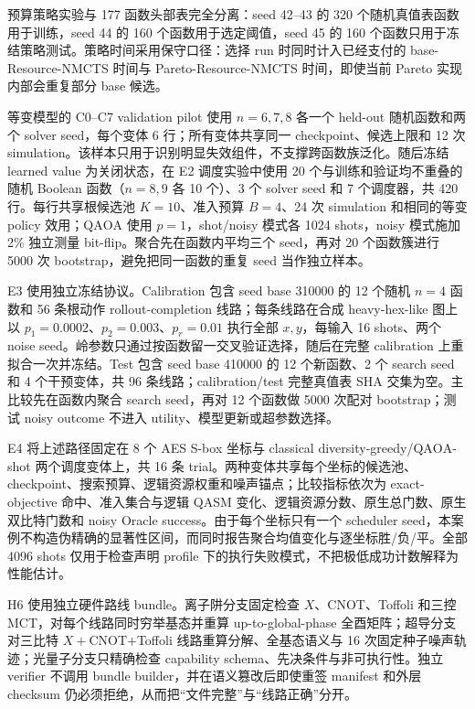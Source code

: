 \documentclass[UTF8,fontset=fandol,11pt]{ctexart}
\newcommand{\method}{Resource-NMCTS}
\newcommand{\qaoa}{\ensuremath{\mathrm{QAOA}}}
\begin{document}
预算策略实验与 177 函数头部表完全分离：seed 42--43 的 320 个随机真值表函数用于训练，seed 44 的 160 个函数用于选定阈值，seed 45 的 160 个函数只用于冻结策略测试。策略时间采用保守口径：选择 run 时同时计入已经支付的 base-\method{} 时间与 Pareto-\method{} 时间，即使当前 Pareto 实现内部会重复部分 base 候选。

等变模型的 C0--C7 validation pilot 使用 $n=6,7,8$ 各一个 held-out 随机函数和两个 solver seed，每个变体 6 行；所有变体共享同一 checkpoint、候选上限和 12 次 simulation。该样本只用于识别明显失效组件，不支撑跨函数族泛化。随后冻结 learned value 为关闭状态，在 E2 调度实验中使用 20 个与训练和验证均不重叠的随机 Boolean 函数（$n=8,9$ 各 10 个）、3 个 solver seed 和 7 个调度器，共 420 行。每行共享根候选池 $K=10$、准入预算 $B=4$、24 次 simulation 和相同的等变 policy 效用；\qaoa{} 使用 $p=1$，shot/noisy 模式各 1024 shots，noisy 模式施加 2\% 独立测量 bit-flip。聚合先在函数内平均三个 seed，再对 20 个函数簇进行 5000 次 bootstrap，避免把同一函数的重复 seed 当作独立样本。

E3 使用独立冻结协议。Calibration 包含 seed base 310000 的 12 个随机 $n=4$ 函数和 56 条根动作 rollout-completion 线路；每条线路在合成 heavy-hex-like 图上以 $p_1=0.0002$、$p_2=0.003$、$p_r=0.01$ 执行全部 $x,y$，每输入 16 shots、两个 noise seed。岭参数只通过按函数留一交叉验证选择，随后在完整 calibration 上重拟合一次并冻结。Test 包含 seed base 410000 的 12 个新函数、2 个 search seed 和 4 个干预变体，共 96 条线路；calibration/test 完整真值表 SHA 交集为空。主比较先在函数内聚合 search seed，再对 12 个函数做 5000 次配对 bootstrap；测试 noisy outcome 不进入 utility、模型更新或超参数选择。

E4 将上述路径固定在 8 个 AES S-box 坐标与 classical diversity-greedy/\qaoa{}-shot 两个调度变体上，共 16 条 trial。两种变体共享每个坐标的候选池、checkpoint、搜索预算、逻辑资源权重和噪声锚点；比较指标依次为 exact-objective 命中、准入集合与逻辑 QASM 变化、逻辑资源分数、原生总门数、原生双比特门数和 noisy Oracle success。由于每个坐标只有一个 scheduler seed，本案例不构造伪精确的显著性区间，而同时报告聚合均值变化与逐坐标胜/负/平。全部 4096 shots 仅用于检查声明 profile 下的执行失败模式，不把极低成功计数解释为性能估计。

H6 使用独立硬件路线 bundle。离子阱分支固定检查 $X$、CNOT、Toffoli 和三控 MCT，对每个线路同时穷举基态并重算 up-to-global-phase 全酉矩阵；超导分支对三比特 $X+$CNOT$+$Toffoli 线路重算分解、全基态语义与 16 次固定种子噪声轨迹；光量子分支只精确检查 capability schema、先决条件与非可执行性。独立 verifier 不调用 bundle builder，并在语义篡改后即使重签 manifest 和外层 checksum 仍必须拒绝，从而把“文件完整”与“线路正确”分开。
\end{document}
